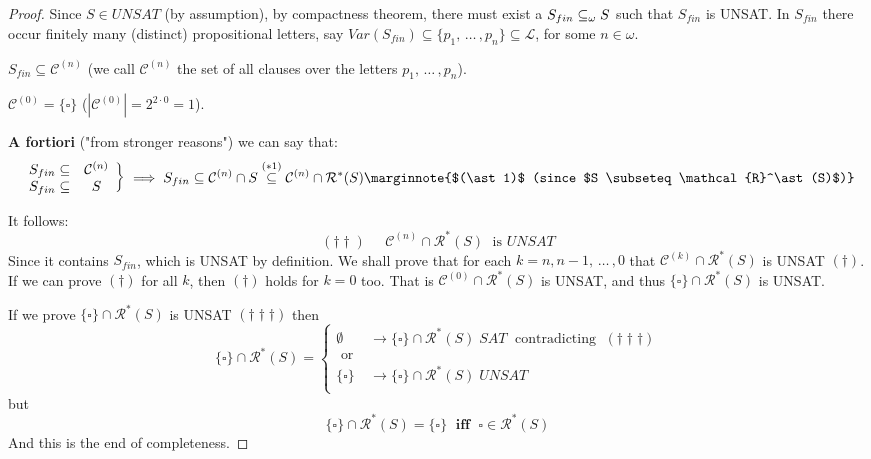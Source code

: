 \begin{proof}
	Since $S \in UNSAT$ (by assumption), by compactness theorem, there must exist a $S_{fin} \subseteq_\omega S$ such that $S_{fin}$ is UNSAT. In $S_{fin}$ there occur finitely many (distinct) propositional letters, say $Var (S_{fin}) \subseteq \{p_1, \, \dots \, , p_n\} \subseteq \mathcal{L}$, for some $n \in \omega$.

	\begin{remark}
		$S_{fin} \subseteq \mathcal{C}^{(n)}$ (we call $\mathcal{C}^{(n)}$ the set of all clauses over the letters $p_1, \, \dots \, , p_n$).
	\end{remark}

	\begin{remark}
		$\mathcal{C}^{(0)} = \{\square\}$ ($|\mathcal{C}^{(0)}| = 2^{2 \cdot 0} = 1$).
	\end{remark}

	\noindent
	\textbf{A fortiori} ("from stronger reasons") we can say that:
	$$
	\left.
	\begin{array}{c c}
		S_{fin} \subseteq &\mathcal{C}^{(n)} \\
		S_{fin} \subseteq & S
	\end{array}
	\right\} \implies S_{fin} \subseteq \mathcal{C}^{(n)} \cap S \stackrel{(\ast 1)}{\subseteq} \mathcal{C}^{(n)} \cap \mathcal{R}^\ast (S) \marginnote{$(\ast 1)$ (since $S \subseteq \mathcal{R}^\ast (S)$)}
	$$

	\noindent
	It follows:
	$$ (\dag \dag) \;\;\;\;\; \mathcal{C}^{(n)} \cap \mathcal{R}^\ast (S) \; \text{ is } UNSAT $$
	Since it contains $S_{fin}$, which is UNSAT by definition.
	We shall prove that for each $k = n, n-1, \, \dots \, , 0$ that $\mathcal{C}^{(k)} \cap \mathcal{R}^\ast (S)$ is UNSAT $(\dag)$.
	If we can prove $(\dag)$ for all $k$, then $(\dag)$ holds for $k = 0$ too. That is $\mathcal{C}^{(0)} \cap \mathcal{R}^\ast (S)$ is UNSAT, and thus $\{\square\} \cap \mathcal{R}^\ast (S)$ is UNSAT.

	If we prove $\{\square\} \cap \mathcal{R}^\ast (S)$ is UNSAT $(\dag\dag\dag)$ then
	$$ \{\square\} \cap \mathcal{R}^\ast (S) = \begin{cases}
		\emptyset & \rightarrow \{\square\} \cap \mathcal{R}^\ast (S) \; SAT \; \text{ contradicting } \; (\dag\dag\dag) \\
		\text{ or } & \\
		\{\square\} & \rightarrow \{\square\} \cap \mathcal{R}^\ast (S) \; UNSAT \\
	\end{cases}
	$$
	but
	$$ \{\square\} \cap \mathcal{R}^\ast (S) = \{\square\} \; \textbf{ iff } \; \square \in \mathcal{R}^\ast (S)$$
	And this is the end of completeness.


\end{proof}
